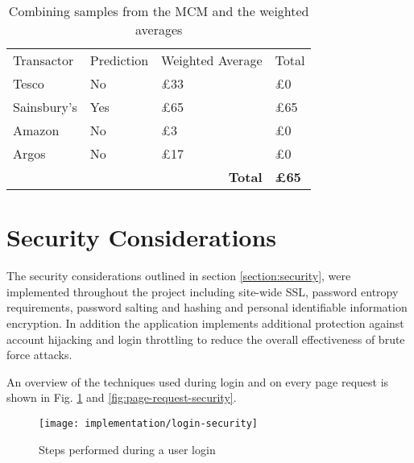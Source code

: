 \begin{table}[h]
\centering
\begin{tabular}{llll}
Transactor  & Prediction & Weighted Average                   & Total        \\
Tesco       & No         & £33                                & £0           \\
Sainsbury's & Yes        & £65                                & £65          \\
Amazon      & No         & £3                                 & £0           \\
Argos       & No         & £17                                & £0           \\
            &            & \multicolumn{1}{r}{\textbf{Total}} & \textbf{£65}
\end{tabular}

\caption{Combining samples from the MCM and the weighted averages}
\label{table:predictions-combined}
\end{table}

\section[Security]{Security Considerations}
The security considerations outlined in section \ref{section:security}, were implemented throughout the project including site-wide SSL, password entropy requirements, password salting and hashing and personal identifiable information encryption. In addition the application implements additional protection against account hijacking and login throttling to reduce the overall effectiveness of brute force attacks. 

An overview of the techniques used during login and on every page request is shown in Fig. \ref{fig:login-security} and \ref{fig:page-request-security}.

\begin{figure}[h]
    \centering
    \texttt{[image: implementation/login-security]}
    \caption{Steps performed during a user login}
    \label{fig:login-security}
    
    \begin{comment}
(start)->[Login Page]->(User Login)-><a>
<a>->|b|
<a>->(Count Recent Failed Logins)-><d>
<d>->(Prevent Login for Threshold Time)->[Login Page]
<d>->[Login Page]
|b|->(Create Login Session)->(end)
|b|->(Record FingerPrint)->(Record Session ID)->(end)
    \end{comment}
\end{figure}

